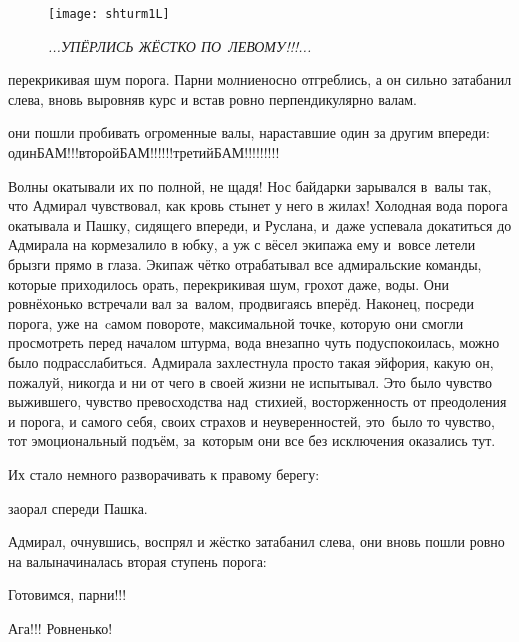 \begin{figure}[h]
	\centering
	\texttt{[image: shturm1L]}
	\caption{\small\textit{...УПЁРЛИСЬ ЖЁСТКО ПО~ЛЕВОМУ!!!...}}
\end{figure}

\noindent перекрикивая шум порога. Парни молниеносно отгреблись, а он сильно затабанил слева, вновь выровняв курс и встав ровно перпендикулярно валам. 

\mdash они пошли пробивать огроменные валы, нараставшие один за другим впереди: один\mdash БАМ!!!\mdash второй\mdash БАМ!!!!!!\mdash третий\mdash БАМ!!!!!!!!!

Волны окатывали их по полной, не щадя! Нос байдарки зарывался в~валы так, что Адмирал чувствовал, как кровь стынет у него в жилах! Холодная вода порога окатывала и Пашку, сидящего впереди, и Руслана, и~даже успевала докатиться до Адмирала на корме\mdash залило в юбку, а уж с вёсел экипажа ему и~вовсе летели брызги прямо в глаза. Экипаж чётко отрабатывал все адмиральские команды, которые приходилось орать, перекрикивая шум, грохот даже, воды. Они ровнёхонько встречали вал за~валом, продвигаясь вперёд. Наконец, посреди порога, уже на~cамом повороте, максимальной точке, которую они смогли просмотреть перед началом штурма, вода внезапно чуть подуспокоилась, можно было подрасслабиться. Адмирала захлестнула просто такая эйфория, какую он, пожалуй, никогда и ни от чего в своей жизни не испытывал. Это было чувство выжившего, чувство превосходства над~стихией, восторженность от преодоления и порога, и самого себя, своих страхов и неуверенностей, это~было то чувство, тот эмоциональный подъём, за~которым они все без исключения оказались тут. 

Их стало немного разворачивать к правому берегу:

\mdash заорал спереди Пашка.

Адмирал, очнувшись, воспрял и жёстко затабанил слева, они вновь пошли ровно на валы\mdash начиналась вторая ступень порога:

\diagdash Готовимся, парни!!!

\diagdash Ага!!! Ровненько!

